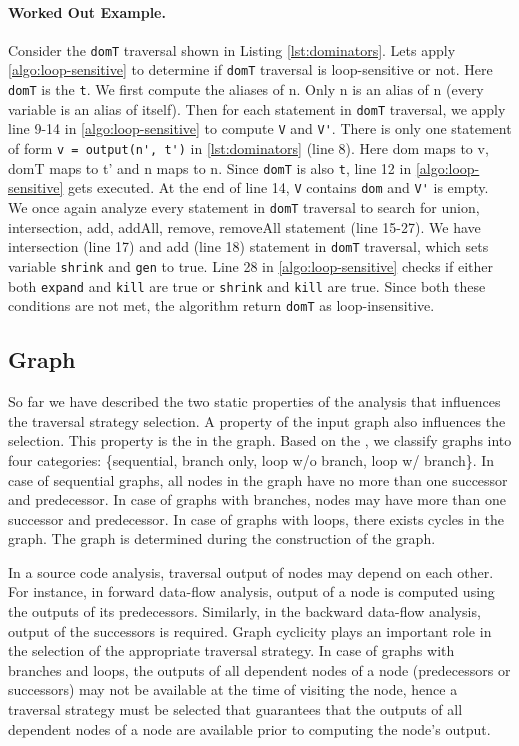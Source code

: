 \paragraph{Worked Out Example.} Consider the \lstinline|domT| traversal shown in Listing
\ref{lst:dominators}. Lets apply \ref{algo:loop-sensitive} to determine if \lstinline|domT| traversal is loop-sensitive or not. Here \lstinline|domT| is the \lstinline|t|. We first compute the aliases of n. Only n is an alias of n (every variable is an alias of itself). Then for each statement in \lstinline|domT| traversal, we apply line 9-14 in \ref{algo:loop-sensitive} to compute \lstinline|V| and \lstinline|V'|. There is only one statement of form \lstinline|v = output(n', t')| in \ref{lst:dominators} (line 8). Here dom maps to v, domT maps to t' and n maps to n. Since \lstinline|domT| is also \lstinline|t|, line 12 in \ref{algo:loop-sensitive} gets executed. At the end of line 14, \lstinline|V| contains \lstinline|dom| and \lstinline|V'| is empty. We once again analyze every statement in \lstinline|domT| traversal to search for union, intersection, add, addAll, remove, removeAll statement (line 15-27). We have intersection (line 17) and add (line 18) statement in \lstinline|domT| traversal, which sets variable \lstinline|shrink| and \lstinline|gen| to true. Line 28 in \ref{algo:loop-sensitive} checks if either both \lstinline|expand| and \lstinline|kill| are true or \lstinline|shrink| and \lstinline|kill| are true. Since both these conditions are not met, the algorithm return \lstinline|domT| as loop-insensitive.
\subsection{Graph \Graphprop}
So far we have described the two static properties of the analysis that
influences the traversal strategy selection. A property of the input graph
also influences the selection. This property is the \graphprop{} in the
graph. Based on the \graphprop{}, we classify graphs into four categories:
\{sequential, branch only, loop w/o branch, loop w/ branch\}. In case of
sequential graphs, all nodes in the graph have no more than one successor and
predecessor. In case of graphs with branches, nodes may have more than one
successor and predecessor. In case of graphs with loops, there exists cycles in
the graph. The graph \graphprop{} is determined during the construction of the
graph.

In a source code analysis, traversal output of nodes may depend on each other.
For instance, in forward data-flow analysis, output of a node is computed using
the outputs of its predecessors. Similarly, in the backward data-flow analysis,
output of the successors is required.
Graph cyclicity plays an important role in the selection of the appropriate
traversal strategy. In case of graphs with branches and loops, the outputs of
all dependent nodes of a node (predecessors or successors) may not be available
at the time of visiting the node, hence a traversal strategy must be selected
that guarantees that the outputs of all dependent nodes of a node are available
prior to computing the node's output. 

